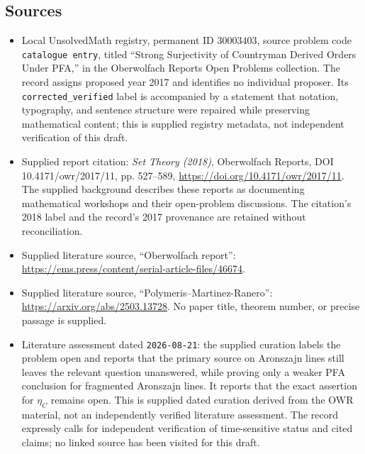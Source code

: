 \documentclass[11pt]{article}
\begin{document}
\subsection{Sources}
\begin{itemize}
\item Local UnsolvedMath registry, permanent ID \(30003403\), source problem code \texttt{catalogue entry}, titled ``Strong Surjectivity of Countryman Derived Orders Under PFA,'' in the Oberwolfach Reports Open Problems collection. The record assigns proposed year 2017 and identifies no individual proposer. Its \texttt{corrected\_verified} label is accompanied by a statement that notation, typography, and sentence structure were repaired while preserving mathematical content; this is supplied registry metadata, not independent verification of this draft.
\item Supplied report citation: \emph{Set Theory (2018)}, Oberwolfach Reports, DOI 10.4171/owr/2017/11, pp. 527--589, \url{https://doi.org/10.4171/owr/2017/11}. The supplied background describes these reports as documenting mathematical workshops and their open-problem discussions. The citation's 2018 label and the record's 2017 provenance are retained without reconciliation.
\item Supplied literature source, ``Oberwolfach report'': \url{https://ems.press/content/serial-article-files/46674}.
\item Supplied literature source, ``Polymeris--Martinez-Ranero'': \url{https://arxiv.org/abs/2503.13728}. No paper title, theorem number, or precise passage is supplied.
\item Literature assessment dated \texttt{2026-08-21}: the supplied curation labels the problem open and reports that the primary source on Aronszajn lines still leaves the relevant question unanswered, while proving only a weaker PFA conclusion for fragmented Aronszajn lines. It reports that the exact assertion for \(\eta_C\) remains open. This is supplied dated curation derived from the OWR material, not an independently verified literature assessment. The record expressly calls for independent verification of time-sensitive status and cited claims; no linked source has been visited for this draft.
\end{itemize}
\end{document}
